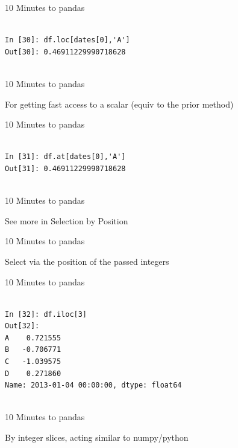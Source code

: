 \documentclass{beamer}
\begin{document}
\begin{frame}[t,fragile]{10 Minutes to pandas}


	\scriptsize
\begin{verbatim}

In [30]: df.loc[dates[0],'A']
Out[30]: 0.46911229990718628


\end{verbatim}


\end{frame}


\begin{frame}[t]{10 Minutes to pandas}

For getting fast access to a scalar (equiv to the prior method)

\end{frame}


\begin{frame}[t,fragile]{10 Minutes to pandas}


	\scriptsize
\begin{verbatim}

In [31]: df.at[dates[0],'A']
Out[31]: 0.46911229990718628


\end{verbatim}


\end{frame}


\begin{frame}[t]{10 Minutes to pandas}

See more in Selection by Position

\end{frame}


\begin{frame}[t]{10 Minutes to pandas}

Select via the position of the passed integers

\end{frame}


\begin{frame}[t,fragile]{10 Minutes to pandas}


	\scriptsize
\begin{verbatim}

In [32]: df.iloc[3]
Out[32]: 
A    0.721555
B   -0.706771
C   -1.039575
D    0.271860
Name: 2013-01-04 00:00:00, dtype: float64


\end{verbatim}


\end{frame}


\begin{frame}[t]{10 Minutes to pandas}

By integer slices, acting similar to numpy/python

\end{frame}
\end{document}
